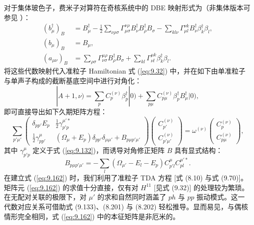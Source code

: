 对于集体玻色子，费米子对算符在奇核系统中的 DBE 映射形式为（非集体版本可参见 \cite{DJ73}）：
\begin{align}
(b^{\dagger}_{\mu})_{B} & =B^{\dagger}_{\mu}-\frac{1}{2}\sum_{\nu\rho\sigma}\Gamma^{\nu\rho}_{\mu\sigma}B^{\dagger}_{\nu}B^{\dagger}_{\rho}B_{\sigma}-\sum_{kl\nu}\Gamma^{\nu k}_{\mu l}B^{\dagger}_{\nu}\beta^{\dagger}_{k}\beta_{l},\nonumber \\
(b_{\mu})_{B} & =B_{\mu},\label{eq:9.160}\\
(a_{\mu\nu})_{B} & =\sum_{\rho\sigma}\Gamma^{\mu\rho}_{\nu\sigma}B^{\dagger}_{\rho}B_{\sigma}+\sum_{kl}\Gamma^{\mu k}_{\nu l}\beta^{\dagger}_{k}\beta_{l}.\nonumber 
\end{align}
将这些代数映射代入准粒子 Hamiltonian 式 (\ref{eq:9.32}) 中，并在如下由单准粒子与单声子构成的截断基底空间中进行对角化：
\begin{equation}
|A+1,\nu)=\sum_{p}C^{(\nu)}_{p}\beta^{\dagger}_{p}|0)+\sum_{p\mu}C^{(\nu)}_{p\mu}\beta^{\dagger}_{p}B^{\dagger}_{\mu}|0),\label{eq:9.161}
\end{equation}
即可直接导出如下久期矩阵方程：
\begin{equation}
\sum_{p'\mu'}\begin{pmatrix}\delta_{pp'}E_{p} & \frac{1}{2}\gamma^{\mu'*}_{p'p}\\
\frac{1}{2}\gamma^{\mu}_{pp'} & (\Omega_{\mu}+E_{p})\delta_{pp'}\delta_{\mu\mu'}+B_{p\mu p'\mu'}
\end{pmatrix}\begin{pmatrix}C^{(\nu)}_{p'}\\
C^{(\nu)}_{p'\mu'}
\end{pmatrix}=\omega^{(\nu)}\begin{pmatrix}C^{(\nu)}_{p}\\
C^{(\nu)}_{p\mu}
\end{pmatrix},\label{eq:9.162}
\end{equation}
其中 $\gamma^{\mu}_{p'p}$ 定义于式 (\ref{eq:9.132})，而诱导对角修正矩阵 $B$ 具有显式结构：
\begin{equation}
B_{p\mu p'\mu'}=-\sum_{l}(\Omega_{\mu'}-E_{l}-E_{p})C^{\mu}_{p'l}C^{\mu'*}_{pl}.\label{eq:9.163}
\end{equation}
在建立式 (\ref{eq:9.162}) 时，我们利用了准粒子 TDA 方程 {[}式 (8.10) 与式 (9.70){]}。矩阵元
(\ref{eq:9.162}) 的求值十分直接，仅有对 $H^{11}$ {[}见式 (9.32){]} 的处理较为繁琐。在无配对关联的极限下，对
$\mu'$ 的求和自然同时涵盖了 $ph$ 与 $pp$ 振动模式。这一代数对应关系可借助式 (9.133)、(8.201)
与 (8.202) 轻松推导。显而易见，与偶核情形完全相同，式 (\ref{eq:9.162}) 中的本征矩阵是非厄米的。

